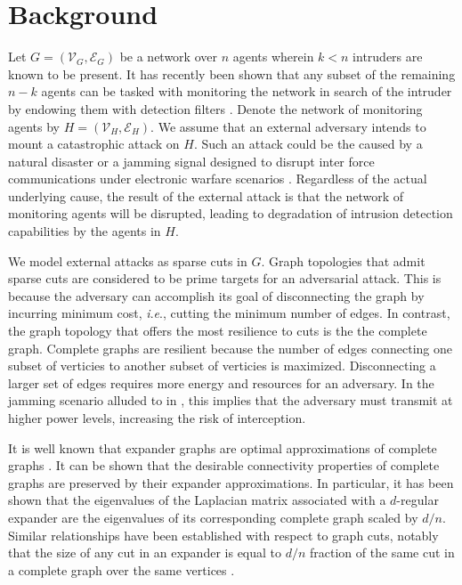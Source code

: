 \documentclass[reqno,8pt]{amsart}
\theoremstyle{definition}
\theoremstyle{remark}
\numberwithin{equation}{section}
\def\cV{\mathcal{V}}
\def\cE{\mathcal{E}}
\newcommand{\ie}{\textit{i}.\textit{e}., }
\begin{document}
\section{Background} \label{sec:background}
Let $G = (\cV_G, \cE_G)$ be a network over $n$ agents wherein $k < n$ intruders are known to be present. It has recently been shown that any subset of the remaining $n-k$ agents can be tasked with monitoring the network in search of the intruder by endowing them with detection filters \cite{Nazari2016}. Denote the network of monitoring agents by $H=(\cV_H,\cE_H)$. %
We assume that an external adversary intends to mount a catastrophic attack on $H$. Such an attack could be the caused by a natural disaster or a jamming signal designed to disrupt inter force communications under electronic warfare scenarios \cite{Feng2015,Naz05}. Regardless of the actual underlying cause, the result of the external attack is that the network of monitoring agents will be disrupted, leading to  degradation of intrusion detection capabilities by the agents in $H$. 

\medskip

We model external attacks as sparse cuts in $G$.  Graph topologies that admit sparse cuts are considered to be  prime targets for an adversarial attack. This is because the adversary can accomplish its goal of disconnecting the graph by incurring minimum cost, \ie cutting the minimum number of edges. In contrast, the graph topology that offers the most resilience to cuts is the the complete graph. Complete graphs are resilient because the number of edges connecting one subset of verticies to another subset of verticies is maximized. Disconnecting a larger set of edges requires more energy and resources for an adversary. In the jamming scenario alluded to in \cite{Feng2015,Naz05}, this implies that the adversary must transmit at higher power levels, increasing the risk of interception.

\medskip

It is well known that expander graphs are optimal approximations of complete graphs \cite{Lub1994,Lub2012,Lub1988,Wig2006}. It can be shown that the desirable connectivity  properties of complete graphs are preserved by their expander approximations. In particular, it has been shown that the eigenvalues of the Laplacian matrix associated with a $d$-regular expander are the eigenvalues of its corresponding complete graph scaled by $d/n$. Similar relationships have been established with respect to graph cuts, notably that the size of any cut in an expander is equal to $d/n$ fraction of the same cut in a complete graph over the same vertices \cite{Gharan2015}.    
\end{document}

